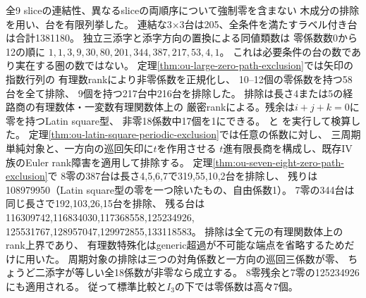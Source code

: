 \documentclass[11pt,a4paper]{ltjsarticle}
\begin{document}
全9 sliceの連結性、異なるsliceの両順序について強制零を含まない
木成分の排除を用い、台を有限列挙した。
連結な3×3台は205、全条件を満たすラベル付き台は合計1381180。
独立三添字と添字方向の置換による同値類数は
零係数数0から12の順に
$1,1,3,9,30,80,201,344,387,217,53,4,1$。
これは必要条件の台の数であり実在する圏の数ではない。
定理\ref{thm:ou-large-zero-path-exclusion}では矢印の指数行列の
有理数rankにより非零係数を正規化し、
10--12個の零係数を持つ58台を全て排除、
9個を持つ217台中216台を排除した。
排除は長さ4または5の経路商の有理数体・一変数有理関数体上の
厳密rankによる。残余は$i+j+k=0$に零を持つLatin square型、
非零18係数中17個を1にできる。
と
を実行して検算した。
定理\ref{thm:ou-latin-square-periodic-exclusion}では任意の係数に対し、
三周期単純対象と、一方向の巡回矢印に$t$を作用させる
$t$進有限長商を構成し、既存IV族のEuler rank障害を適用して排除する。
定理\ref{thm:ou-seven-eight-zero-path-exclusion}で
8零の387台は長さ4,5,6,7で319,55,10,2台を排除し、
残りは108979950（Latin square型の零を一つ除いたもの、自由係数1）。
7零の344台は同じ長さで192,103,26,15台を排除、
残る台は116309742,116834030,117368558,125234926,
125531767,128957047,129972855,133118583。
排除は全て元の有理関数体上のrank上界であり、
有理数特殊化はgeneric超過が不可能な端点を省略するためだけに用いた。
周期対象の排除は三つの対角係数と一方向の巡回三係数が零、
ちょうど二添字が等しい全18係数が非零なら成立する。
8零残余と7零の125234926にも適用される。
従って標準比較と$I_3$の下では零係数は高々7個。
\end{document}
